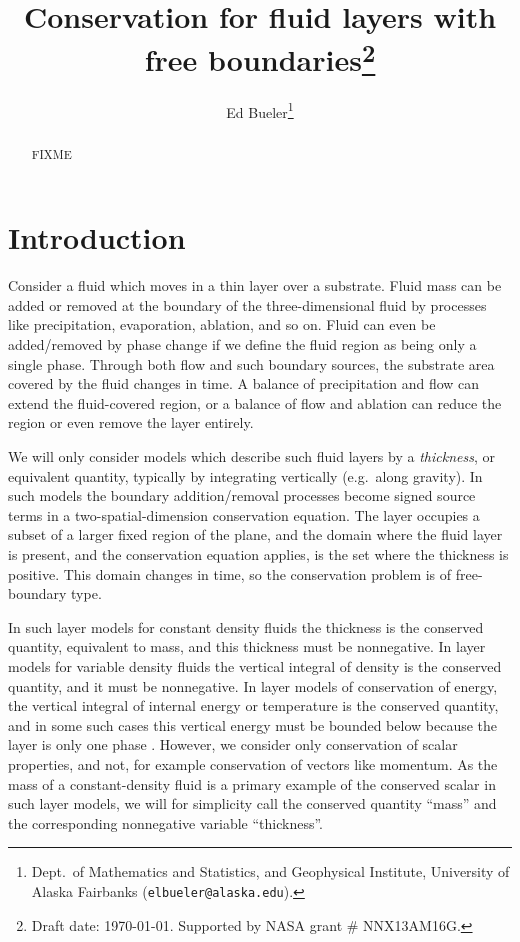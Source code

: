 \documentclass[final,leqno,onefignum,onetabnum]{siamltex1213bueler}
\title{Conservation for fluid layers with free boundaries\thanks{Draft date: \today.  Supported by NASA grant \# NNX13AM16G.}}
\author{Ed Bueler\thanks{Dept.~of Mathematics and Statistics, and Geophysical Institute, University of Alaska Fairbanks (\texttt{elbueler@alaska.edu}).}}
\begin{document}
\maketitle
{}

\begin{abstract}
FIXME
\end{abstract}


\pagestyle{myheadings}
\thispagestyle{plain}


\section{Introduction}  \label{sec:intro}

Consider a fluid which moves in a thin layer over a substrate.  Fluid mass can be added or removed at the boundary of the three-dimensional fluid by processes like precipitation, evaporation, ablation, and so on.  Fluid can even be added/removed by phase change if we define the fluid region as being only a single phase.  Through both flow and such boundary sources, the substrate area covered by the fluid changes in time.  A balance of precipitation and flow can extend the fluid-covered region, or a balance of flow and ablation can reduce the region or even remove the layer entirely.

We will only consider models which describe such fluid layers by a \emph{thickness}, or equivalent quantity, typically by integrating vertically (e.g.~along gravity).  In such models the boundary addition/removal processes become signed source terms in a two-spatial-dimension conservation equation.  The layer occupies a subset of a larger fixed region of the plane, and the domain where the fluid layer is present, and the conservation equation applies, is the set where the thickness is positive.  This domain changes in time, so the conservation problem is of free-boundary type.

In such layer models for constant density fluids the thickness is the conserved quantity, equivalent to mass, and this thickness must be nonnegative.  In layer models for variable density fluids the vertical integral of density is the conserved quantity, and it must be nonnegative.  In layer models of conservation of energy, the vertical integral of internal energy or temperature is the conserved quantity, and in some such cases this vertical energy must be bounded below because the layer is only one phase \cite{AschwandenBuelerKhroulevBlatter}.  However, we consider only conservation of scalar properties, and not, for example conservation of vectors like momentum.  As the mass of a constant-density fluid is a primary example of the conserved scalar in such layer models, we will for simplicity call the conserved quantity ``mass'' and the corresponding nonnegative variable ``thickness''.
\end{document}
